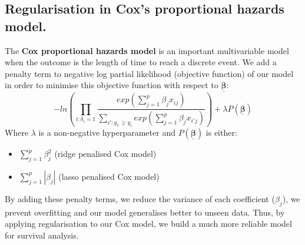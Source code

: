 \documentclass[12pt]{article}
\begin{document}
\subsection*{Regularisation in Cox's proportional hazards model.}
The \textbf{Cox proportional hazards model} is an important multivariable model when the outcome is the length of time to reach a discrete event. We add a penalty term to negative log partial likelihood (objective function)
of our model in order to minimise this objective function with respect to $\boldsymbol{\underline{\beta}}$:
$$ -ln\left(\prod_{i:\delta_i=1}\frac{exp(\sum_{j=1}^{p}\beta_j x_{ij})}{\sum_{i':y_{i'}\geq y_i}exp(\sum_{j=1}^{p} \beta_j x_{i'j})}\right) + \lambda P(\boldsymbol{\underline{\beta}})$$
Where $\lambda$ is a non-negative hyperparameter and $P(\boldsymbol{\underline{\beta}})$ is either:
\begin{itemize}
    \item $\sum_{j=1}^{p}\beta_{j}^2$ (ridge penalised Cox model)
    \item $\sum_{j=1}^{p}|\beta_j|$ (lasso penalised Cox model)
\end{itemize}
By adding these penalty terms, we reduce the variance of each coefficient ($\beta_j$), we prevent overfitting and our model
generalises better to unseen data. Thus, by applying regularisation to our Cox model, we build a much more reliable model for survival analysis.

\newpage
\end{document}
